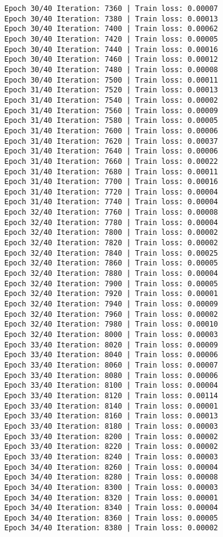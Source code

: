 \documentclass[11pt]{article}
\begin{document}
\begin{Verbatim}[commandchars=\\\{\}]
Epoch 30/40 Iteration: 7360 | Train loss: 0.00007
Epoch 30/40 Iteration: 7380 | Train loss: 0.00013
Epoch 30/40 Iteration: 7400 | Train loss: 0.00062
Epoch 30/40 Iteration: 7420 | Train loss: 0.00005
Epoch 30/40 Iteration: 7440 | Train loss: 0.00016
Epoch 30/40 Iteration: 7460 | Train loss: 0.00012
Epoch 30/40 Iteration: 7480 | Train loss: 0.00008
Epoch 30/40 Iteration: 7500 | Train loss: 0.00011
Epoch 31/40 Iteration: 7520 | Train loss: 0.00013
Epoch 31/40 Iteration: 7540 | Train loss: 0.00002
Epoch 31/40 Iteration: 7560 | Train loss: 0.00009
Epoch 31/40 Iteration: 7580 | Train loss: 0.00005
Epoch 31/40 Iteration: 7600 | Train loss: 0.00006
Epoch 31/40 Iteration: 7620 | Train loss: 0.00037
Epoch 31/40 Iteration: 7640 | Train loss: 0.00006
Epoch 31/40 Iteration: 7660 | Train loss: 0.00022
Epoch 31/40 Iteration: 7680 | Train loss: 0.00011
Epoch 31/40 Iteration: 7700 | Train loss: 0.00016
Epoch 31/40 Iteration: 7720 | Train loss: 0.00004
Epoch 31/40 Iteration: 7740 | Train loss: 0.00004
Epoch 32/40 Iteration: 7760 | Train loss: 0.00008
Epoch 32/40 Iteration: 7780 | Train loss: 0.00004
Epoch 32/40 Iteration: 7800 | Train loss: 0.00002
Epoch 32/40 Iteration: 7820 | Train loss: 0.00002
Epoch 32/40 Iteration: 7840 | Train loss: 0.00025
Epoch 32/40 Iteration: 7860 | Train loss: 0.00005
Epoch 32/40 Iteration: 7880 | Train loss: 0.00004
Epoch 32/40 Iteration: 7900 | Train loss: 0.00005
Epoch 32/40 Iteration: 7920 | Train loss: 0.00001
Epoch 32/40 Iteration: 7940 | Train loss: 0.00009
Epoch 32/40 Iteration: 7960 | Train loss: 0.00002
Epoch 32/40 Iteration: 7980 | Train loss: 0.00010
Epoch 32/40 Iteration: 8000 | Train loss: 0.00003
Epoch 33/40 Iteration: 8020 | Train loss: 0.00009
Epoch 33/40 Iteration: 8040 | Train loss: 0.00006
Epoch 33/40 Iteration: 8060 | Train loss: 0.00007
Epoch 33/40 Iteration: 8080 | Train loss: 0.00006
Epoch 33/40 Iteration: 8100 | Train loss: 0.00004
Epoch 33/40 Iteration: 8120 | Train loss: 0.00114
Epoch 33/40 Iteration: 8140 | Train loss: 0.00001
Epoch 33/40 Iteration: 8160 | Train loss: 0.00013
Epoch 33/40 Iteration: 8180 | Train loss: 0.00003
Epoch 33/40 Iteration: 8200 | Train loss: 0.00002
Epoch 33/40 Iteration: 8220 | Train loss: 0.00002
Epoch 33/40 Iteration: 8240 | Train loss: 0.00003
Epoch 34/40 Iteration: 8260 | Train loss: 0.00004
Epoch 34/40 Iteration: 8280 | Train loss: 0.00008
Epoch 34/40 Iteration: 8300 | Train loss: 0.00003
Epoch 34/40 Iteration: 8320 | Train loss: 0.00001
Epoch 34/40 Iteration: 8340 | Train loss: 0.00004
Epoch 34/40 Iteration: 8360 | Train loss: 0.00005
Epoch 34/40 Iteration: 8380 | Train loss: 0.00002

\end{Verbatim}
\end{document}
